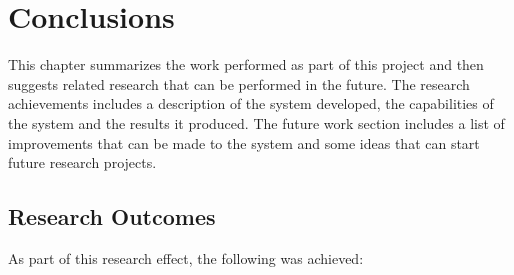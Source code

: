 \chapter{Conclusions}
\label{ch:conclusions}

This chapter summarizes the work performed as part of this project and then suggests related research that can be performed in the future. The research achievements includes a description of the system developed, the capabilities of the system and the results it produced. The future work section includes a list of improvements that can be made to the system and some ideas that can start future research projects.\\

\section{Research Outcomes}

As part of this research effect, the following was achieved:

